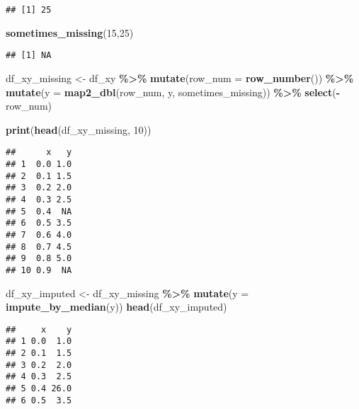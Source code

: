 \documentclass[
]{article}
\newenvironment{Shaded}{\begin{snugshade}}{\end{snugshade}}
\newcommand{\AttributeTok}[1]{\textcolor[rgb]{0.13,0.29,0.53}{#1}}
\newcommand{\DecValTok}[1]{\textcolor[rgb]{0.00,0.00,0.81}{#1}}
\newcommand{\FunctionTok}[1]{\textcolor[rgb]{0.13,0.29,0.53}{\textbf{#1}}}
\newcommand{\NormalTok}[1]{#1}
\newcommand{\OtherTok}[1]{\textcolor[rgb]{0.56,0.35,0.01}{#1}}
\newcommand{\SpecialCharTok}[1]{\textcolor[rgb]{0.81,0.36,0.00}{\textbf{#1}}}
\begin{document}
\begin{verbatim}
## [1] 25
\end{verbatim}

\begin{Shaded}
\begin{Highlighting}[]
\FunctionTok{sometimes\_missing}\NormalTok{(}\DecValTok{15}\NormalTok{,}\DecValTok{25}\NormalTok{)}
\end{Highlighting}
\end{Shaded}

\begin{verbatim}
## [1] NA
\end{verbatim}

\begin{Shaded}
\begin{Highlighting}[]
\NormalTok{df\_xy\_missing }\OtherTok{\textless{}{-}}\NormalTok{ df\_xy }\SpecialCharTok{\%\textgreater{}\%}
  \FunctionTok{mutate}\NormalTok{(}\AttributeTok{row\_num =} \FunctionTok{row\_number}\NormalTok{()) }\SpecialCharTok{\%\textgreater{}\%}
  \FunctionTok{mutate}\NormalTok{(}\AttributeTok{y =} \FunctionTok{map2\_dbl}\NormalTok{(row\_num, y, sometimes\_missing)) }\SpecialCharTok{\%\textgreater{}\%}
  \FunctionTok{select}\NormalTok{(}\SpecialCharTok{{-}}\NormalTok{row\_num)}

\FunctionTok{print}\NormalTok{(}\FunctionTok{head}\NormalTok{(df\_xy\_missing, }\DecValTok{10}\NormalTok{))}
\end{Highlighting}
\end{Shaded}

\begin{verbatim}
##      x   y
## 1  0.0 1.0
## 2  0.1 1.5
## 3  0.2 2.0
## 4  0.3 2.5
## 5  0.4  NA
## 6  0.5 3.5
## 7  0.6 4.0
## 8  0.7 4.5
## 9  0.8 5.0
## 10 0.9  NA
\end{verbatim}

\begin{Shaded}
\begin{Highlighting}[]
\NormalTok{df\_xy\_imputed }\OtherTok{\textless{}{-}}\NormalTok{ df\_xy\_missing }\SpecialCharTok{\%\textgreater{}\%}
  \FunctionTok{mutate}\NormalTok{(}\AttributeTok{y =} \FunctionTok{impute\_by\_median}\NormalTok{(y))}
\FunctionTok{head}\NormalTok{(df\_xy\_imputed)}
\end{Highlighting}
\end{Shaded}

\begin{verbatim}
##     x    y
## 1 0.0  1.0
## 2 0.1  1.5
## 3 0.2  2.0
## 4 0.3  2.5
## 5 0.4 26.0
## 6 0.5  3.5
\end{verbatim}
\end{document}
